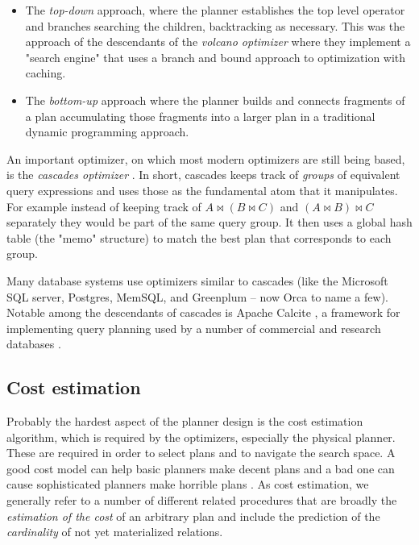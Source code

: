 \begin{itemize}
\item The \emph{top-down} approach, where the planner establishes the
  top level operator and branches searching the children, backtracking
  as necessary. This was the approach of the descendants of the
  \emph{volcano optimizer} \cite{graefeVolcanoOptimizerGenerator1993a}
  where they implement a "search engine" that uses a branch and bound
  approach to optimization with caching.
\item The \emph{bottom-up} approach where the planner builds and
  connects fragments of a plan accumulating those fragments into a
  larger plan in a traditional dynamic programming approach.
  \cite{raasveldtDuckdbEmbeddableAnalytical2019,kemperHyPerHybridOLTP2011}
\end{itemize}

An important optimizer, on which most modern optimizers are still
being based, is the \emph{cascades optimizer}
\cite{graefeCascadesFrameworkQuery1995}. In short, cascades keeps
track of \emph{groups} of equivalent query expressions and uses those
as the fundamental atom that it manipulates. For example instead of
keeping track of \(A \Join (B \Join C)\) and \((A \Join B) \Join C\)
separately they would be part of the same query group. It then uses a
global hash table (the "memo" structure) to match the best plan that
corresponds to each group.

Many database systems use optimizers similar to cascades (like the
Microsoft SQL server, Postgres,
MemSQL\cite{chenMemSQLQueryOptimizer2016}, and Greenplum -- now Orca
\cite{solimanOrcaModularQuery2014a} to name a few). Notable among the
descendants of cascades is Apache Calcite
\cite{begoliApacheCalciteFoundational2018}, a framework for
implementing query planning used by a number of commercial and
research databases \cite{nunesalonsoBuildingPolyglotData2020}.

\subsection{Cost estimation}

Probably the hardest aspect of the planner design is the cost
estimation algorithm, which is required by the optimizers, especially
the physical planner. These are required in order to select plans and
to navigate the search space. A good cost model can help basic
planners make decent plans and a bad one can cause sophisticated
planners make horrible plans \cite{leisHowGoodAre2015}. As cost
estimation, we generally refer to a number of different related
procedures that are broadly the \emph{estimation of the cost} of an
arbitrary plan and include the prediction of the \emph{cardinality} of
not yet materialized relations.

